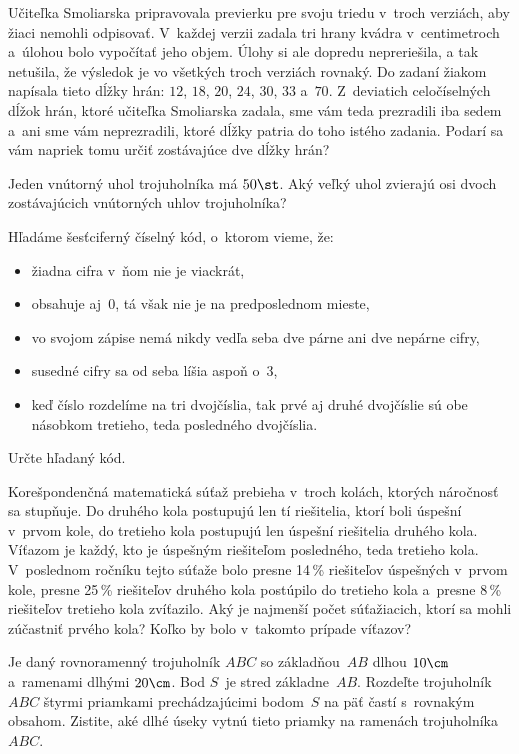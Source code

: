 {%
Učiteľka Smoliarska pripravovala previerku pre svoju triedu v~troch verziách, aby žiaci nemohli odpisovať. V~každej verzii zadala tri hrany kvádra v~centimetroch a~úlohou bolo vypočítať jeho objem. Úlohy si ale dopredu nepreriešila, a tak netušila, že výsledok je vo všetkých troch verziách rovnaký. Do zadaní žiakom napísala tieto dĺžky hrán: $12$, $18$, $20$, $24$, $30$, $33$ a~$70$. Z~deviatich celočíselných dĺžok hrán, ktoré učiteľka Smoliarska zadala, sme vám teda prezradili iba sedem a~ani sme vám neprezradili, ktoré dĺžky patria do toho istého zadania. Podarí sa vám napriek tomu určiť zostávajúce dve dĺžky hrán?}

{%
Jeden vnútorný uhol trojuholníka má $50\st$.
Aký veľký uhol zvierajú osi dvoch zostávajúcich vnútorných uhlov trojuholníka?}

{%
Hľadáme šesťciferný číselný kód, o~ktorom vieme, že:
\begin{itemize}
  \item žiadna cifra v~ňom nie je viackrát,
  \item obsahuje aj~$0$, tá však nie je na predposlednom mieste,
  \item vo svojom zápise nemá nikdy vedľa seba dve párne ani dve nepárne cifry,
  \item susedné cifry sa od seba líšia aspoň o~$3$,
  \item keď číslo rozdelíme na tri dvojčíslia, tak prvé aj druhé dvojčíslie sú obe násobkom tretieho, teda posledného dvojčíslia.
\end{itemize}
Určte hľadaný kód.}

{%
Korešpondenčná matematická súťaž prebieha v~troch kolách, ktorých náročnosť sa stupňuje.
Do druhého kola postupujú len tí riešitelia, ktorí boli úspešní v~prvom kole, do tretieho kola postupujú len úspešní riešitelia druhého kola.
Víťazom je každý, kto je úspešným riešiteľom posledného, teda tretieho kola. V~poslednom ročníku tejto súťaže bolo presne 14\,\% riešiteľov úspešných v~prvom kole, presne 25\,\% riešiteľov druhého kola postúpilo do tretieho kola a~presne
8\,\% riešiteľov tretieho kola zvíťazilo. Aký je najmenší počet súťažiacich, ktorí sa mohli zúčastniť prvého kola?
Koľko by bolo v~takomto prípade víťazov?}

{%
Je daný rovnoramenný trojuholník $ABC$ so základňou~$AB$ dlhou $10\cm$
a~ramenami dlhými $20\cm$. Bod $S$~je stred základne~$AB$.
Rozdeľte trojuholník $ABC$ štyrmi priamkami prechádzajúcimi bodom~$S$ na päť
častí s~rovnakým obsahom.
Zistite, aké dlhé úseky vytnú tieto priamky na ramenách trojuholníka $ABC$.}


